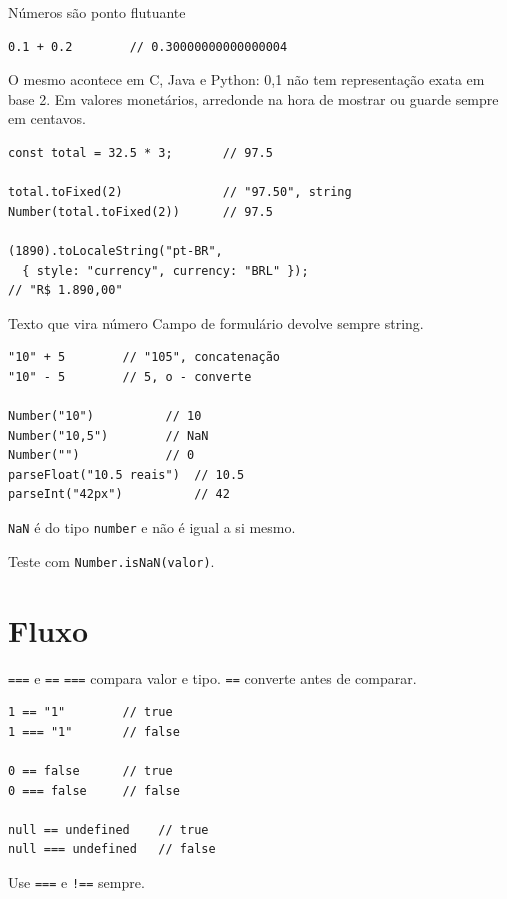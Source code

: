 \documentclass{beamer}
\begin{document}
\begin{frame}[fragile]{Números são ponto flutuante}
	\begin{verbatim}
0.1 + 0.2        // 0.30000000000000004
	\end{verbatim}

	\vspace{0.2cm}
	O mesmo acontece em C, Java e Python: 0,1 não tem representação exata em
	base 2. Em valores monetários, arredonde na hora de mostrar ou guarde sempre
	em centavos.

	\begin{verbatim}
const total = 32.5 * 3;       // 97.5

total.toFixed(2)              // "97.50", string
Number(total.toFixed(2))      // 97.5

(1890).toLocaleString("pt-BR",
  { style: "currency", currency: "BRL" });
// "R$ 1.890,00"
	\end{verbatim}
\end{frame}

\begin{frame}[fragile]{Texto que vira número}
	Campo de formulário devolve sempre string.

	\begin{verbatim}
"10" + 5        // "105", concatenação
"10" - 5        // 5, o - converte

Number("10")          // 10
Number("10,5")        // NaN
Number("")            // 0
parseFloat("10.5 reais")  // 10.5
parseInt("42px")          // 42
	\end{verbatim}

	\vspace{0.2cm}
	\texttt{NaN} é do tipo \texttt{number} e não é igual a si mesmo.

	\vspace{0.1cm}
	Teste com \texttt{Number.isNaN(valor)}.
\end{frame}

\section{Fluxo}

\begin{frame}[fragile]{\texttt{===} e \texttt{==}}
	\texttt{===} compara valor e tipo. \texttt{==} converte antes de comparar.

	\begin{verbatim}
1 == "1"        // true
1 === "1"       // false

0 == false      // true
0 === false     // false

null == undefined    // true
null === undefined   // false
	\end{verbatim}

	\vspace{0.2cm}
	Use \texttt{===} e \texttt{!==} sempre.
\end{frame}
\end{document}
